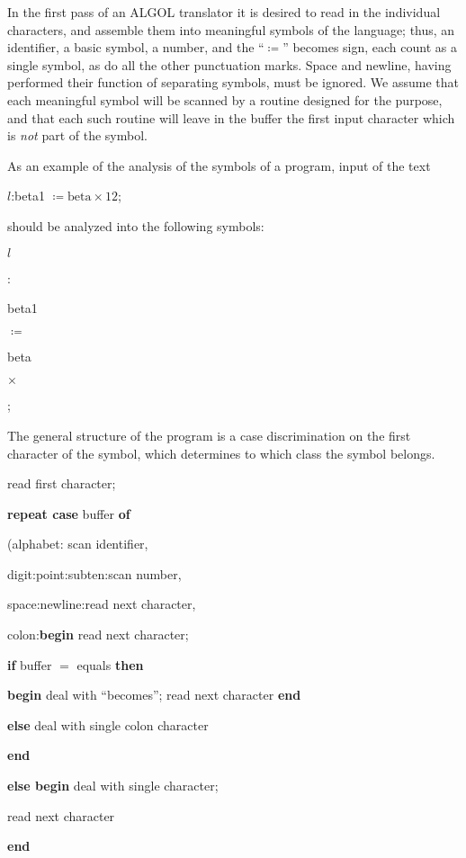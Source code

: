 In the first pass of an ALGOL translator it is desired to read in the individual characters, and assemble them into meaningful symbols of the language; thus, an identifier, a basic symbol, a number, and the ``$\coloneq$'' becomes sign, each count as a single symbol, as do all the other punctuation marks. Space and newline, having performed their function of separating symbols, must be ignored. We assume that each meaningful symbol will be scanned by a routine designed for the purpose, and that each such routine will leave in the buffer the first input character which is \textit{not} part of the symbol.

As an example of the analysis of the symbols of a program, input of the text

\quad $l$:beta1 $\coloneq \text{beta} \times 12$;

\noindent
should be analyzed into the following symbols:

\quad $l$

\quad :

\quad beta1

\quad $\coloneq$

\quad beta

\quad $\times$


\quad ;

The general structure of the program is a case discrimination on the first character of the symbol, which determines to which class the symbol belongs.

read first character;

\textbf{repeat case} buffer \textbf{of}

\quad (alphabet: scan identifier,

\quad digit:point:subten:scan number,

\quad space:newline:read next character,

\quad colon:\textbf{begin} read next character;

\quad\quad \textbf{if} buffer $=$ equals \textbf{then}

\quad\quad\quad \textbf{begin} deal with ``becomes''; read next character \textbf{end}

\quad\quad \textbf{else} deal with single colon character

\quad\quad \textbf{end}

\quad \textbf{else begin} deal with single character;

\quad\quad read next character

\quad \textbf{end}


